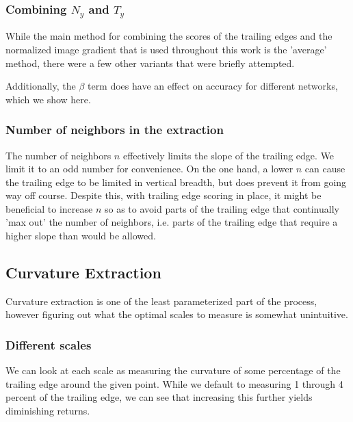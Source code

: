 
\subsubsection{Combining $N_y$ and $T_y$}

While the main method for combining the scores of the trailing edges and the normalized image gradient that is used throughout this work is the 'average' method, there were a few other variants that were briefly attempted.

Additionally, the $\beta$ term does have an effect on accuracy for different networks, which we show here. %

\subsubsection{Number of neighbors in the extraction}

The number of neighbors $n$ effectively limits the slope of the trailing edge.
We limit it to an odd number for convenience.
On the one hand, a lower $n$ can cause the trailing edge to be limited in vertical breadth, but does prevent it from going way off course.
Despite this, with trailing edge scoring in place, it might be beneficial to increase $n$ so as to avoid parts of the trailing edge that continually 'max out' the number of neighbors, i.e. parts of the trailing edge that require a higher slope than would be allowed.


\subsection{Curvature Extraction}

Curvature extraction is one of the least parameterized part of the process, however figuring out what the optimal scales to measure is somewhat unintuitive.

\subsubsection{Different scales}

We can look at each scale as measuring the curvature of some percentage of the trailing edge around the given point.
While we default to measuring 1 through 4 percent of the trailing edge, we can see that increasing this further yields diminishing returns. %

